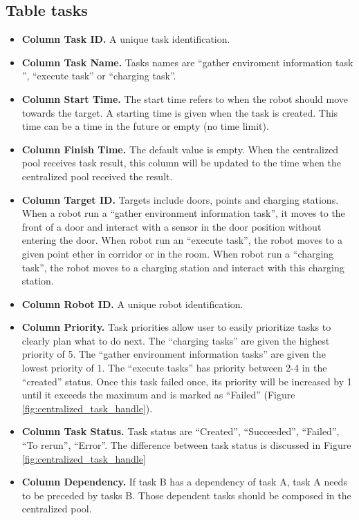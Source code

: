 \subsection*{Table tasks}
\begin{itemize}
    \label{sec:task_table}
    \item \textbf{Column Task ID.} A unique task identification.
    \item \textbf{Column Task Name.} Tasks names are ``gather enviroment information task '', ``execute task'' or ``charging task''.
    \item \textbf{Column Start Time.} The start time refers to when the robot should move towards the target. A starting time is given when the task is created. This time can be a time in the future or empty (no time limit). 
    \item \textbf{Column Finish Time.} The default value is empty. When the centralized pool receives task result, this column will be updated to the time when the centralized pool received the result.
    \item \textbf{Column Target ID.} Targets include doors, points and charging stations. When a robot run a ``gather environment information task'', it moves to the front of a door and interact with a sensor in the door position without entering the door. 
    When robot run an ``execute task'', the robot moves to a given point ether in corridor or in the room. When robot run a ``charging task'', the robot moves to a charging station and interact with this charging station.
    \item \textbf{Column Robot ID.} A unique robot identification.
    \item \textbf{Column Priority.} Task priorities allow user to easily prioritize tasks to clearly plan what to do next. The ``charging tasks'' are given the highest priority of 5. The ``gather environment information tasks'' are given the lowest priority of 1. The ``execute tasks'' has priority between 2-4 in the ``created'' status. Once this task failed once, its priority will be increased by 1 until it exceeds the maximum and is marked as ``Failed'' (Figure \ref{fig:centralized_task_handle}).
    \item \textbf{Column Task Status.} Task status are ``Created'', ``Succeeded'', ``Failed'', ``To rerun'', ``Error''. The difference between task status is discussed in Figure \ref{fig:centralized_task_handle}
    \item \textbf{Column Dependency.} If task B has a dependency of task A, task A needs to be preceded by tasks B. Those dependent tasks should be composed in the centralized pool.

\end{itemize}
